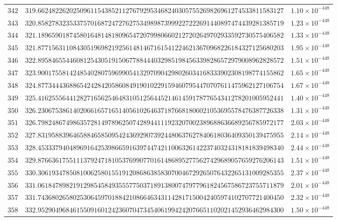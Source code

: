 \documentclass[12pt,reqno]{amsart}
\theoremstyle{remark}
\begin{document}
\begin{longtable}{clc}
$342$ & $319.6624822620250961154385211276792953468240305755269826961274533811583127$ & $1.10\times 10^{-448}$ \\
$343$ & $320.8582783235337570168724727627534989873999227222691440897474439281385719$ & $1.23\times 10^{-448}$ \\
$344$ & $321.1896590187458016481481809654720799806602127202649702933592730575406582$ & $1.33\times 10^{-448}$ \\
$345$ & $321.8771563110843051969821925614814671615412246213670968226184327125680203$ & $1.95\times 10^{-448}$ \\
$346$ & $322.8958465544608125430519150677884440329851984563398286572979008962828572$ & $1.51\times 10^{-448}$ \\
$347$ & $323.9001755814248540280759699054132970904298026034168333902308198774155862$ & $1.65\times 10^{-448}$ \\
$348$ & $324.8773444368865424284205860849190102291594607954470707611475962127106754$ & $1.67\times 10^{-448}$ \\
$349$ & $325.4162555644128271656254648310512564452146145917877654341278201005952441$ & $1.40\times 10^{-448}$ \\
$350$ & $326.2306753861402066165716514056102646371876681806021053695578476387726338$ & $1.31\times 10^{-448}$ \\
$351$ & $326.7982486749863572814978962507428944111923207002389688636689256785972177$ & $2.03\times 10^{-448}$ \\
$352$ & $327.8319588396465884658509542436929073924480637627840618036409350139475955$ & $2.14\times 10^{-448}$ \\
$353$ & $328.4533379404896916425398665916397447421100632614223740324318181839498340$ & $2.44\times 10^{-448}$ \\
$354$ & $329.8766361755111379247181053769907701614868952775627429689057659276206143$ & $1.51\times 10^{-448}$ \\
$355$ & $330.3061934785081006258015519120868638583070046729265076432265131009285355$ & $2.37\times 10^{-448}$ \\
$356$ & $331.0618478982191298545849355577503718913800747977961824567586723755711879$ & $2.01\times 10^{-448}$ \\
$357$ & $331.7436802658025306459701884210866463431142817150042405974102707721400450$ & $2.32\times 10^{-448}$ \\
$358$ & $332.9529049684615509160124236070473454061994242076651102021452936462984300$ & $1.50\times 10^{-448}$ \\

\end{longtable}
\end{document}
